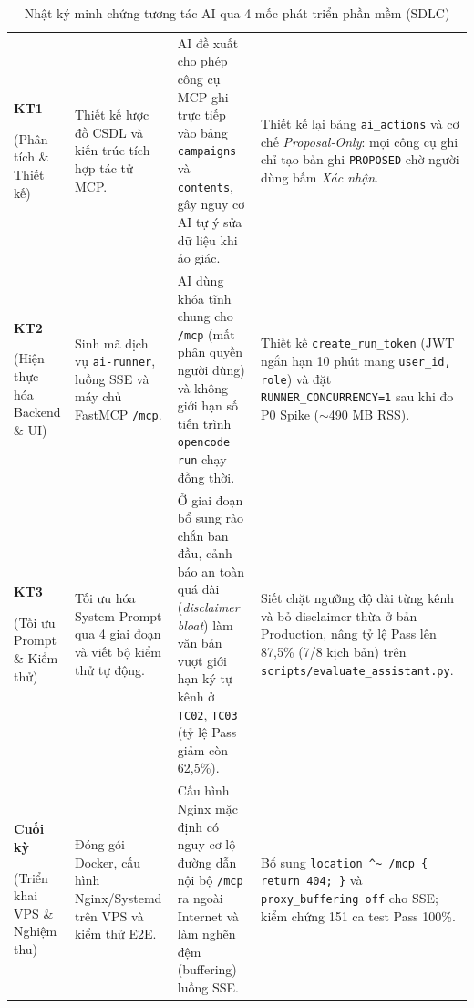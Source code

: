 \begin{table}[!htbp]
\centering
\scriptsize
\renewcommand{\arraystretch}{0.95}
\caption{Nhật ký minh chứng tương tác AI qua 4 mốc phát triển phần mềm (SDLC)}\label{tab:sdlc-ai-log}
\begin{tabularx}{\textwidth}{|C{1.8cm}|L{3.0cm}|Y|Y|}
\hline
{} &  &  & \\
\hline
\textbf{KT1}\par (Phân tích \& Thiết kế) & Thiết kế lược đồ CSDL và kiến trúc tích hợp tác tử MCP. & AI đề xuất cho phép công cụ MCP ghi trực tiếp vào bảng \texttt{campaigns} và \texttt{contents}, gây nguy cơ AI tự ý sửa dữ liệu khi ảo giác. & Thiết kế lại bảng \texttt{ai\_actions} và cơ chế \textit{Proposal-Only}: mọi công cụ ghi chỉ tạo bản ghi \texttt{PROPOSED} chờ người dùng bấm \textit{Xác nhận}.\\
\hline
\textbf{KT2}\par (Hiện thực hóa Backend \& UI) & Sinh mã dịch vụ \texttt{ai-runner}, luồng SSE và máy chủ FastMCP \texttt{/mcp}. & AI dùng khóa tĩnh chung cho \texttt{/mcp} (mất phân quyền người dùng) và không giới hạn số tiến trình \texttt{opencode run} chạy đồng thời. & Thiết kế \texttt{create\_run\_token} (JWT ngắn hạn 10 phút mang \texttt{user\_id, role}) và đặt \texttt{RUNNER\_CONCURRENCY=1} sau khi đo P0 Spike ($\sim$490 MB RSS).\\
\hline
\textbf{KT3}\par (Tối ưu Prompt \& Kiểm thử) & Tối ưu hóa System Prompt qua 4 giai đoạn và viết bộ kiểm thử tự động. & Ở giai đoạn bổ sung rào chắn ban đầu, cảnh báo an toàn quá dài (\textit{disclaimer bloat}) làm văn bản vượt giới hạn ký tự kênh ở \texttt{TC02}, \texttt{TC03} (tỷ lệ Pass giảm còn 62,5\%). & Siết chặt ngưỡng độ dài từng kênh và bỏ disclaimer thừa ở bản Production, nâng tỷ lệ Pass lên 87,5\% (7/8 kịch bản) trên \texttt{scripts/evaluate\_assistant.py}.\\
\hline
\textbf{Cuối kỳ}\par (Triển khai VPS \& Nghiệm thu) & Đóng gói Docker, cấu hình Nginx/Systemd trên VPS và kiểm thử E2E. & Cấu hình Nginx mặc định có nguy cơ lộ đường dẫn nội bộ \texttt{/mcp} ra ngoài Internet và làm nghẽn đệm (buffering) luồng SSE. & Bổ sung \texttt{location \^{}\~{} /mcp \{ return 404; \}} và \texttt{proxy\_buffering off} cho SSE; kiểm chứng 151 ca test Pass 100\%.\\
\hline
\end{tabularx}
\end{table}


